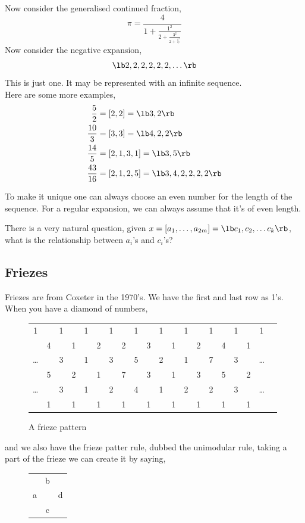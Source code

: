 \documentclass{article}
\begin{document}
Now consider the generalised continued fraction,
$$ \pi = \frac{4}{1 + \frac{1^2}{2 + \frac{3^2}{2 + \frac{5^2}{\ddots}}}} $$
Now consider the negative expansion,
$$ \lb 2, 2, 2, 2, 2, 2, \dots\rb  $$
This is just one. It may be represented with an infinite sequence.\\

Here are some more examples,
\begin{align*}
  \frac{5}{2} &= [2, 2] = \lb  3, 2 \rb \\
  \frac{10}{3} &= [3, 3] = \lb  4, 2, 2 \rb \\
  \frac{14}{5} &= [2, 1, 3, 1] = \lb  3, 5 \rb \\
  \frac{43}{16} &= [2, 1, 2, 5] = \lb  3, 4, 2, 2, 2, 2 \rb
\end{align*}

\begin{remark}
  To make it unique one can always choose an even number for the length of the sequence. For a regular expansion, we can always assume that it's of even length.
\end{remark}

There is a very natural question, given $x = [a_1, \dots, a_{2m}] = \lb c_1, c_2, \dots c_k \rb $, what is the relationship between $a_i$'s and $c_i$'s?

\subsection{Friezes}
Friezes are from Coxeter in the 1970's. We have the first and last row as 1's. When you have a diamond of numbers,

\begin{figure}[!ht]
\centering
\begin{tabular}{cccccccccccccccccccc}
 1&&1&&1&&1&&1&&1&&1&&1&&1&&1 \\
 &4&&1&&2&&2&&3&&1&&2&&4&&1&\\
 \dots&&3&&1&&3&&5&&2&&1&&7&&3&&\dots\\
 &5&&2&&1&&7&&3&&1&&3&&5&&2&\\
 \dots&&3&&1&&2&&4&&1&&2&&2&&3&&\dots\\
  &1&&1&&1&&1&&1&&1&&1&&1&&1& \\
\end{tabular}
\caption{A frieze pattern}
\end{figure}

and we also have the frieze patter rule, dubbed the unimodular rule, taking a part of the frieze we can create it by saying,
\begin{figure}[!ht]
  \centering
  \begin{tabular}{ccc}
    &b&\\
    a&&d\\
    &c&\\
  \end{tabular}
\end{figure}
\end{document}
